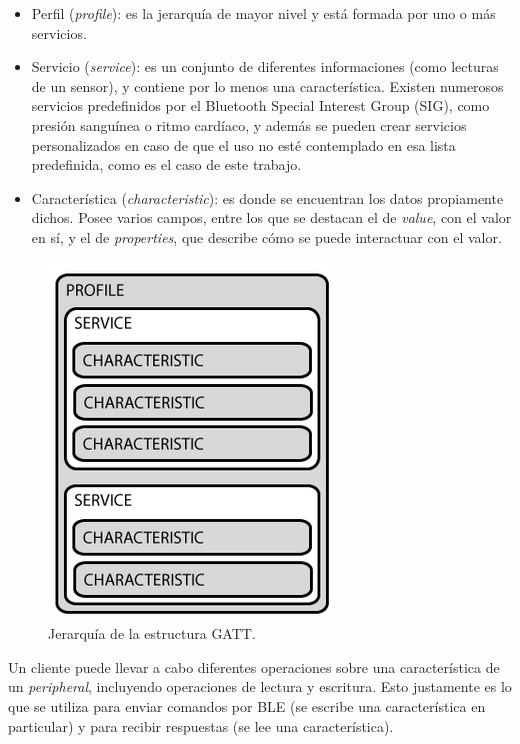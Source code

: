 \begin{itemize}
	\item Perfil (\emph{profile}): es la jerarquía de mayor nivel y está formada por uno o más servicios.
	\item Servicio (\emph{service}): es un conjunto de diferentes informaciones (como lecturas de un sensor), y contiene por lo menos una característica. Existen numerosos servicios predefinidos por el Bluetooth Special Interest Group (SIG), como presión sanguínea o ritmo cardíaco, y además se pueden crear servicios personalizados en caso de que el uso no esté contemplado en esa lista predefinida, como es el caso de este trabajo.
	\item Característica (\emph{characteristic}): es donde se encuentran los datos propiamente dichos. Posee varios campos, entre los que se destacan el de \emph{value}, con el valor en sí, y el de \emph{properties}, que describe cómo se puede interactuar con el valor.
\end{itemize}

\begin{figure}[h]
\centering
\includegraphics[scale=0.5]{./Figures/gatt.png}
\caption[Jerarquía de la estructura GATT.]{Jerarquía de la estructura GATT.\footnotemark}
\label{fig:gatt}
\end{figure}


Un cliente puede llevar a cabo diferentes operaciones sobre una característica de un \emph{peripheral}, incluyendo operaciones de lectura y escritura. Esto justamente es lo que se utiliza para enviar comandos por BLE (se escribe una característica en particular) y para recibir respuestas (se lee una característica).

